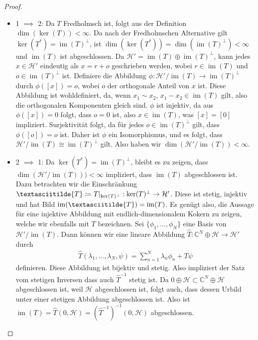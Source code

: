\documentclass[11pt, hidelinks]{article}
\newcommand{\h}{\mathcal{H}}
\newcommand{\im}{\operatorname{im}}
\numberwithin{conj}{section}
\begin{document}
\begin{proof}\noindent
\begin{itemize}
    \item 1 $\implies$ 2: Da $T$ Fredholmsch ist, folgt aus der Definition $\dim(\ker(T)) < \infty$. Da nach der Fredholmschen Alternative \cite[Satz 5.9]{lechner} gilt $\ker(T^\ast) = \im(T)^\perp$, ist $\dim(\ker(T^\ast)) = \dim(\im(T)^\perp) < \infty$ und $\im(T)$ ist abgeschlossen. Da \( \h' = \im(T) \oplus \im(T)^\perp \), kann jedes \( x \in \h' \) eindeutig als \( x = r + o \) geschrieben werden, wobei \( r \in \im(T) \) und \( o \in \im(T)^\perp \) ist. Definiere die Abbildung \( \phi: \h' / \im(T) \to \im(T)^\perp \) durch \( \phi([x]) = o \), wobei \( o \) der orthogonale Anteil von \( x \) ist. Diese Abbildung ist wohldefiniert, da, wenn \( x_1 \sim x_2 \), \( x_1 - x_2 \in \im(T) \) gilt, also die orthogonalen Komponenten gleich sind. \( \phi \) ist injektiv, da aus \( \phi([x]) = 0 \) folgt, dass \( o = 0 \) ist, also \( x \in \im(T) \), was \( [x] = [0] \) impliziert. Surjektivität folgt, da für jedes \( o \in \im(T)^\perp \) gilt, dass \( \phi([o]) = o \) ist. Daher ist \( \phi \) ein Isomorphismus, und es folgt, dass \( \h' / \im(T) \cong \im(T)^\perp \) gilt. Also haben wir $\dim(\h'/\im(T)) < \infty$.
    \item 2 $\implies$ 1: Da $\ker(T^\ast) = \im(T)^\perp$, bleibt es zu zeigen, dass $\dim(\h'/\im(T))) < \infty$ impliziert, dass $\im(T)$ abgeschlossen ist. Dazu betrachten wir die Einschränkung $\textasciitilde{T} \coloneq T\vert_{\ker(T)^\perp}: \ker(T)^\perp \rightarrow \h'$. Diese ist stetig, injektiv und hat Bild $\im(\textasciitilde{T}) = \im(T)$. Es genügt also, die Aussage für eine injektive Abbildung mit endlich-dimensionalem Kokern zu zeigen, welche wir ebenfalls mit $T$ bezeichnen. Sei $\{\phi_1, \ldots, \phi_N\}$ eine Basis von $\h'/\im(T)$. Dann können wir eine lineare Abbildung $\hat{T}: \mathbb{C}^N \oplus \h \to \h'$ durch
    \begin{align}
        \hat{T}(\lambda_1, \ldots, \lambda_N, \psi) = \sum_{n=1}^{N} \lambda_n \phi_n + T\psi
    \end{align}
    definieren. Diese Abbildung ist bijektiv und stetig. Also impliziert der Satz vom stetigen Inversen \cite[Korollar 3.24]{lechner} dass auch $\hat{T}^{-1}$ stetig ist. Da $0 \oplus \h \subset \mathbb{C}^N \oplus \h$ abgeschlossen ist, weil $\h$ abgeschlossen ist, folgt auch, dass dessen Urbild unter einer stetigen Abbildung abgeschlossen ist. Also ist $\im(T) = \hat{T}(0,\h) = (\hat{T}^{-1})^{-1}(0,\h)$ abgeschlossen.

\end{itemize}
\end{proof}
\end{document}
